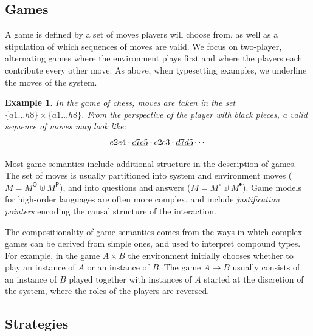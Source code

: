 \documentclass[11pt,oneside,draft]{book}
\newtheorem{example}[theorem]{Example}
\theoremstyle{definition}
\newcommand{\kw}[1]{\ensuremath{ \mathsf{#1} }}
\newcommand{\que}{\circ}         %
\newcommand{\ans}{\bullet}       %
\newcommand{\ul}[1]{%
  \underline{\smash{#1}}
}
\begin{document}

\subsection{Games} \label{sec:mainideas:gs:games} %

A game is defined by a set of moves
players will choose from,
as well as a stipulation of which
sequences of moves are valid.
We focus on two-player, alternating games
where the environment plays first and
where the players
each contribute every other move.
As above, when typesetting examples,
we underline the moves of the system.

\begin{example}
In the game of chess,
moves are taken in the set $\{a1 \ldots h8\} \times \{a1 \ldots h8\}$.
From the perspective of the player
with black pieces,
a valid sequence of moves may look like:
\[ e2e4 \cdot \ul{c7c5} \cdot c2c3 \cdot \ul{d7d5} \cdots \]
\end{example}


Most game semantics
include additional structure
in the description of games.
The set of moves is usually partitioned
into system and environment moves ($M = M^\kw{O} \uplus M^\kw{P}$),
and into questions and answers ($M = M^\que \uplus M^\ans$).
Game models for high-order languages are often more complex,
and include \emph{justification pointers}
encoding the causal structure of the interaction.

The compositionality of game semantics
comes from the ways in which complex games can be derived from simple ones,
and used to interpret compound types.
For example,
in the game $A \times B$
the environment initially chooses whether to play
an instance of $A$ or an instance of $B$.
The game $A \rightarrow B$ usually consists of
an instance of $B$ played
together with instances of $A$
started at the discretion of the system,
where the roles of the players are reversed.


\subsection{Strategies} \label{sec:bg:strat} %
\end{document}
